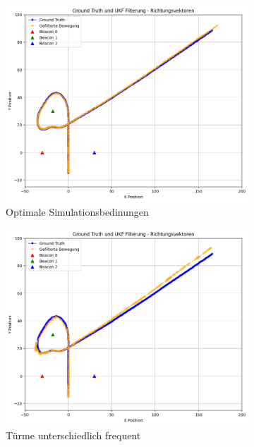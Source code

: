 \begin{figure}
    \begin{subfigure}{.333\textwidth}
        \centering
        \includegraphics[width=.9\linewidth]{Ergebnisse/plots_fahrten/richtung/richtung_dyn_acc_basic.png}  
        \caption{Optimale Simulationsbedinungen}
    \end{subfigure}    
    \begin{subfigure}{.333\textwidth}
        \centering
        \includegraphics[width=.9\linewidth]{Ergebnisse/plots_fahrten/richtung/richtung_dyn_acc_freq.png} 
        \caption{Türme unterschiedlich frequent}
    \end{subfigure}    
    \begin{subfigure}{.333\textwidth}

\end{subfigure}
\end{figure}
